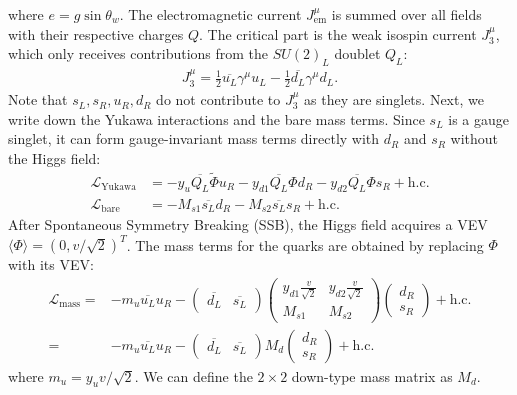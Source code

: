 where $e = g \sin\theta_w$. The electromagnetic current $J^\mu_\text{em}$ is summed over all fields with their respective charges $Q$. The critical part is the weak isospin current $J^\mu_3$, which only receives contributions from the $SU(2)_L$ doublet $Q_L$:
\begin{align}
    J^\mu_3 = \frac{1}{2} \overline{u_L} \gamma^\mu u_L - \frac{1}{2} \overline{d_L} \gamma^\mu d_L.
\end{align} 
Note that $s_L, s_R, u_R, d_R$ do not contribute to $J^\mu_3$ as they are singlets. Next, we write down the Yukawa interactions and the bare mass terms. Since $s_L$ is a gauge singlet, it can form gauge-invariant mass terms directly with $d_R$ and $s_R$ without the Higgs field:
\begin{align}
    \mathcal{L}_\text{Yukawa} &= -y_u \overline{Q_L} \tilde{\Phi} u_R - y_{d1} \overline{Q_L} \Phi d_R - y_{d2} \overline{Q_L} \Phi s_R + \text{h.c.} \\
    \mathcal{L}_\text{bare} &= -M_{s1} \overline{s_L} d_R - M_{s2} \overline{s_L} s_R + \text{h.c.}
\end{align}
After Spontaneous Symmetry Breaking (SSB), the Higgs field acquires a VEV $\langle \Phi \rangle = (0, v/\sqrt{2})^T$. The mass terms for the quarks are obtained by replacing $\Phi$ with its VEV:
\begin{align}
    \mathcal{L}_\text{mass} =& -m_u \overline{u_L} u_R - 
    \begin{pmatrix} 
        \overline{d_L} & \overline{s_L} 
    \end{pmatrix} 
    \begin{pmatrix} 
        y_{d1}\frac{v}{\sqrt{2}} & y_{d2}\frac{v}{\sqrt{2}}\\ 
        M_{s1} & M_{s2} 
    \end{pmatrix} 
    \begin{pmatrix} 
        d_R \\ 
        s_R 
    \end{pmatrix} + \text{h.c.}\\
    =&-m_u \overline{u_L} u_R - 
    \begin{pmatrix} 
        \overline{d_L} & \overline{s_L} 
    \end{pmatrix} M_d    
    \begin{pmatrix} 
        d_R \\ 
        s_R 
    \end{pmatrix} + \text{h.c.}
\end{align}
where $m_u = y_u v/\sqrt{2}$. We can define the $2 \times 2$ down-type mass matrix as $M_d$. 

